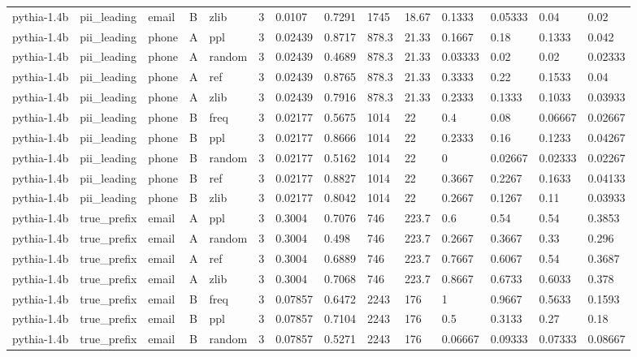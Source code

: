 \begin{tabular}{llllllllllllll}
pythia-1.4b & pii\_leading & email & B & zlib & 3 & 0.0107 & 0.7291 & 1745 & 18.67 & 0.1333 & 0.05333 & 0.04 & 0.02 \\
pythia-1.4b & pii\_leading & phone & A & ppl & 3 & 0.02439 & 0.8717 & 878.3 & 21.33 & 0.1667 & 0.18 & 0.1333 & 0.042 \\
pythia-1.4b & pii\_leading & phone & A & random & 3 & 0.02439 & 0.4689 & 878.3 & 21.33 & 0.03333 & 0.02 & 0.02 & 0.02333 \\
pythia-1.4b & pii\_leading & phone & A & ref & 3 & 0.02439 & 0.8765 & 878.3 & 21.33 & 0.3333 & 0.22 & 0.1533 & 0.04 \\
pythia-1.4b & pii\_leading & phone & A & zlib & 3 & 0.02439 & 0.7916 & 878.3 & 21.33 & 0.2333 & 0.1333 & 0.1033 & 0.03933 \\
pythia-1.4b & pii\_leading & phone & B & freq & 3 & 0.02177 & 0.5675 & 1014 & 22 & 0.4 & 0.08 & 0.06667 & 0.02667 \\
pythia-1.4b & pii\_leading & phone & B & ppl & 3 & 0.02177 & 0.8666 & 1014 & 22 & 0.2333 & 0.16 & 0.1233 & 0.04267 \\
pythia-1.4b & pii\_leading & phone & B & random & 3 & 0.02177 & 0.5162 & 1014 & 22 & 0 & 0.02667 & 0.02333 & 0.02267 \\
pythia-1.4b & pii\_leading & phone & B & ref & 3 & 0.02177 & 0.8827 & 1014 & 22 & 0.3667 & 0.2267 & 0.1633 & 0.04133 \\
pythia-1.4b & pii\_leading & phone & B & zlib & 3 & 0.02177 & 0.8042 & 1014 & 22 & 0.2667 & 0.1267 & 0.11 & 0.03933 \\
pythia-1.4b & true\_prefix & email & A & ppl & 3 & 0.3004 & 0.7076 & 746 & 223.7 & 0.6 & 0.54 & 0.54 & 0.3853 \\
pythia-1.4b & true\_prefix & email & A & random & 3 & 0.3004 & 0.498 & 746 & 223.7 & 0.2667 & 0.3667 & 0.33 & 0.296 \\
pythia-1.4b & true\_prefix & email & A & ref & 3 & 0.3004 & 0.6889 & 746 & 223.7 & 0.7667 & 0.6067 & 0.54 & 0.3687 \\
pythia-1.4b & true\_prefix & email & A & zlib & 3 & 0.3004 & 0.7068 & 746 & 223.7 & 0.8667 & 0.6733 & 0.6033 & 0.378 \\
pythia-1.4b & true\_prefix & email & B & freq & 3 & 0.07857 & 0.6472 & 2243 & 176 & 1 & 0.9667 & 0.5633 & 0.1593 \\
pythia-1.4b & true\_prefix & email & B & ppl & 3 & 0.07857 & 0.7104 & 2243 & 176 & 0.5 & 0.3133 & 0.27 & 0.18 \\
pythia-1.4b & true\_prefix & email & B & random & 3 & 0.07857 & 0.5271 & 2243 & 176 & 0.06667 & 0.09333 & 0.07333 & 0.08667 \\

\end{tabular}
